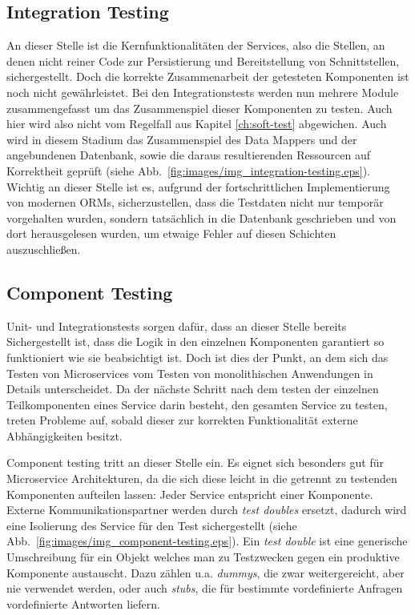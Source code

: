 \documentclass[12pt,a4paper,bibliography=totocnumbered,listof=totocnumbered]{scrartcl}
\begin{document}

\subsection{Integration Testing}

An dieser Stelle ist die Kernfunktionalitäten der Services, also die Stellen, an denen nicht reiner Code zur Persistierung und Bereitstellung von Schnittstellen, sichergestellt. Doch die korrekte Zusammenarbeit der getesteten Komponenten ist noch nicht gewährleistet. Bei den Integrationstests werden nun mehrere Module zusammengefasst um das Zusammenspiel dieser Komponenten zu testen.\cite{clemson} Auch hier wird also nicht vom Regelfall aus Kapitel \ref{ch:soft-test} abgewichen. Auch wird in diesem Stadium das Zusammenspiel des Data Mappers und der angebundenen Datenbank, sowie die daraus resultierenden Ressourcen auf Korrektheit geprüft (siehe Abb.~\ref{fig:images/img_integration-testing.eps}). Wichtig an dieser Stelle ist es, aufgrund der fortschrittlichen Implementierung von modernen \acp{ORM}, sicherzustellen, dass die Testdaten nicht nur temporär vorgehalten wurden, sondern tatsächlich in die Datenbank geschrieben und von dort herausgelesen wurden, um etwaige Fehler auf diesen Schichten auszuschließen.\cite{clemson}


\subsection{Component Testing}

Unit- und Integrationstests sorgen dafür, dass an dieser Stelle bereits Sichergestellt ist, dass die Logik in den einzelnen Komponenten garantiert so funktioniert wie sie beabsichtigt ist. Doch ist dies der Punkt, an dem sich das Testen von Microservices vom Testen von monolithischen Anwendungen in Details unterscheidet. Da der nächste Schritt nach dem testen der einzelnen Teilkomponenten eines Service darin besteht, den gesamten Service zu testen, treten Probleme auf, sobald dieser zur korrekten Funktionalität externe Abhängigkeiten besitzt.

Component testing tritt an dieser Stelle ein. Es eignet sich besonders gut für Microservice Architekturen, da die sich diese leicht in die getrennt zu testenden Komponenten aufteilen lassen: Jeder Service entspricht einer Komponente. Externe Kommunikationspartner werden durch \textit{test doubles} ersetzt, dadurch wird eine Isolierung des Service für den Test sichergestellt (siehe Abb.~\ref{fig:images/img_component-testing.eps}).\cite{clemson} Ein \textit{test double} ist eine generische Umschreibung für ein Objekt welches man zu Testzwecken gegen ein produktive Komponente austauscht. Dazu zählen u.a. \textit{dummys}, die zwar weitergereicht, aber nie verwendet werden, oder auch \textit{stubs}, die für bestimmte vordefinierte Anfragen vordefinierte Antworten liefern.\cite{fowlertestdouble}
\end{document}
